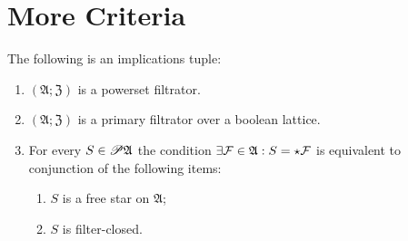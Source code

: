 \section{More Criteria}
\begin{thm}
\label{closed-free-star}The following is an implications tuple:
\begin{enumerate}
\item \label{closed-free-star-p}$(\mathfrak{A};\mathfrak{Z})$ is a powerset
filtrator.
\item \label{closed-free-star-fltr}$(\mathfrak{A};\mathfrak{Z})$ is a
primary filtrator over a boolean lattice.
\item \label{closed-free-star-conc}For every $S\in\mathscr{P}\mathfrak{A}$
the condition $\exists\mathcal{F}\in\mathfrak{A}:S=\star\mathcal{F}$
is equivalent to conjunction of the following items:

\begin{enumerate}
\item \label{fs-star}$S$ is a free star on $\mathfrak{A}$;
\item \label{fs-fclos}$S$ is filter-closed.
\end{enumerate}
\end{enumerate}
\end{thm}
